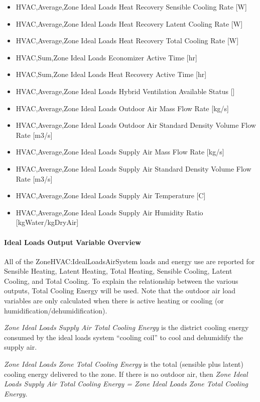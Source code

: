 \begin{itemize}
\item
  HVAC,Average,Zone Ideal Loads Heat Recovery Sensible Cooling Rate {[}W{]}
\item
  HVAC,Average,Zone Ideal Loads Heat Recovery Latent Cooling Rate {[}W{]}
\item
  HVAC,Average,Zone Ideal Loads Heat Recovery Total Cooling Rate {[}W{]}
\item
  HVAC,Sum,Zone Ideal Loads Economizer Active Time {[}hr{]}
\item
  HVAC,Sum,Zone Ideal Loads Heat Recovery Active Time {[}hr{]}
\item
  HVAC,Average,Zone Ideal Loads Hybrid Ventilation Available Status {[]}
\item
  HVAC,Average,Zone Ideal Loads Outdoor Air Mass Flow Rate {[}kg/s{]}
\item
  HVAC,Average,Zone Ideal Loads Outdoor Air Standard Density Volume Flow Rate {[}m3/s{]}
\item
  HVAC,Average,Zone Ideal Loads Supply Air Mass Flow Rate {[}kg/s{]}
\item
  HVAC,Average,Zone Ideal Loads Supply Air Standard Density Volume Flow Rate {[}m3/s{]}
\item
  HVAC,Average,Zone Ideal Loads Supply Air Temperature {[}\si{C}{]}
\item
  HVAC,Average,Zone Ideal Loads Supply Air Humidity Ratio {[}kgWater/kgDryAir{]}      
\end{itemize}

\paragraph{Ideal Loads Output Variable Overview}\label{ideal-loads-output-variable-overview}

All of the ZoneHVAC:IdealLoadsAirSystem loads and energy use are reported for Sensible Heating, Latent Heating, Total Heating, Sensible Cooling, Latent Cooling, and Total Cooling. To explain the relationship between the various outputs, Total Cooling Energy will be used. Note that the outdoor air load variables are only calculated when there is active heating or cooling (or humidification/dehumidification).

\emph{Zone Ideal Loads Supply Air Total Cooling Energy} is the district cooling energy consumed by the ideal loads system ``cooling coil'' to cool and dehumidify the supply air.

\emph{Zone Ideal Loads Zone Total Cooling Energy} is the total (sensible plus latent) cooling energy delivered to the zone. If there is no outdoor air, then \emph{Zone Ideal Loads Supply Air Total Cooling Energy = Zone Ideal Loads Zone Total Cooling Energy.}

